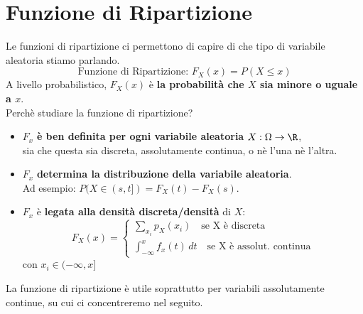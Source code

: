 \pagebreak

\section{Funzione di Ripartizione}
Le funzioni di ripartizione ci permettono di capire di che tipo di variabile aleatoria
stiamo parlando.
\[
	\text{Funzione di Ripartizione: } F_X (x) = P(X \leq x)
\]
A livello probabilistico, $F_X(x)$ è \textbf{la probabilità che $X$ sia minore o uguale a $x$}.
\\Perchè studiare la funzione di ripartizione?
\begin{itemize}
	\item $F_x$ \textbf{è ben definita per ogni variabile aleatoria} $X: \Omega \rightarrow \R$,
	      \\sia che questa sia discreta, assolutamente continua, o nè l'una nè l'altra.
	\item $F_x$\textbf{ determina la distribuzione della variabile aleatoria}.
	      \\Ad esempio: $P(X\in(s,t]) = F_X(t) - F_X(s)$.
	\item $F_x$ è \textbf{legata alla densità discreta/densità} di $X$:
	      \[
		      F_X(x) =
		      \begin{cases}
			      \sum_{x_i} p_X (x_i) \quad \text{se X è discreta} \\
			      \int_{-\infty}^{x} f_x(t)\,dt \quad \text{se X è assolut. continua}
		      \end{cases}
	      \]
	      con $x_i \in (- \infty, x]$
\end{itemize}
La funzione di ripartizione è utile soprattutto per variabili assolutamente continue, su cui
ci concentreremo nel seguito.


